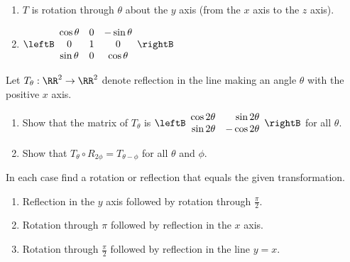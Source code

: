 \begin{multicols}{2}
\begin{ex}
\begin{enumerate}[label={\alph*.}]
\item $T$ is rotation through $\theta$ about the $y$ axis (from the $x$ axis to the $z$ axis).

\end{enumerate}
\begin{sol}
\begin{enumerate}[label={\alph*.}]
\setcounter{enumi}{1}
\item $\leftB \begin{array}{ccc}
\cos \theta & 0 & -\sin \theta \\
0 & 1 & 0 \\
\sin \theta & 0 & \cos \theta
\end{array} \rightB$

\end{enumerate}
\end{sol}
\end{ex}

\begin{ex}
Let $T_{\theta} : \RR^2 \to \RR^2$ denote reflection in the line making an angle $\theta$ with the positive $x$ axis.

\begin{enumerate}[label={\alph*.}]
\item Show that the matrix of $T_{\theta}$ is $\leftB \begin{array}{rr}
\cos 2\theta & \sin 2\theta \\
\sin 2\theta & -\cos 2\theta
\end{array} \rightB$ for all $\theta$.

\item Show that $T_{\theta} \circ R_{2\phi} = T_{\theta - \phi}$ for all $\theta$ and $\phi$.

\end{enumerate}
\end{ex}

\begin{ex}
In each case find a rotation or reflection that equals the given transformation.

\begin{enumerate}[label={\alph*.}]
\item Reflection in the $y$ axis followed by rotation through $\frac{\pi}{2}$.

\item Rotation through $\pi$ followed by reflection in the $x$ axis.

\item Rotation through $\frac{\pi}{2}$ followed by reflection in the line $y = x$.


\end{enumerate}
\end{ex}
\end{multicols}
